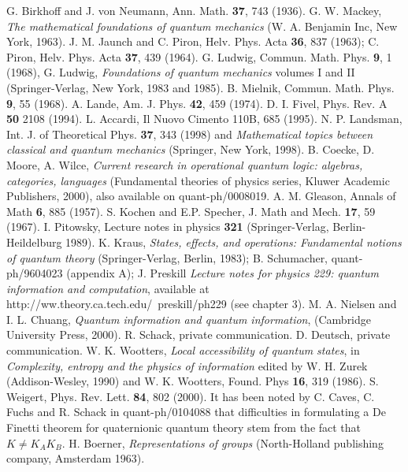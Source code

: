 \documentclass[12pt]{article}
\begin{document}
\begin{thebibliography}{00}
 G. Birkhoff and J. von Neumann, Ann. Math. {\bf 37},
743 (1936).
 G. W. Mackey, {\it The mathematical foundations of
quantum mechanics} (W. A. Benjamin Inc, New York, 1963).
 J. M. Jaunch and C. Piron, Helv. Phys. Acta {\bf 36},
837 (1963); C. Piron, Helv. Phys. Acta {\bf 37}, 439 (1964).
 G. Ludwig, Commun. Math. Phys. {\bf 9}, 1 (1968), G.
Ludwig, {\it Foundations of quantum mechanics} volumes I and II
(Springer-Verlag, New York, 1983 and 1985).
 B. Mielnik, Commun. Math. Phys. {\bf 9}, 55 (1968).
 A. Lande, Am. J. Phys. {\bf 42}, 459 (1974).
 D. I. Fivel, Phys. Rev. A {\bf 50} 2108 (1994).
 L. Accardi, Il Nuovo Cimento 110B, 685 (1995).
 N. P. Landsman, Int. J. of Theoretical Phys. {\bf
37}, 343 (1998) and {\it Mathematical topics between classical and
quantum mechanics} (Springer, New York, 1998).
 B. Coecke, D. Moore, A. Wilce, {\it Current research in
operational quantum logic: algebras, categories, languages} (Fundamental
theories of physics series, Kluwer Academic Publishers, 2000), also
available on quant-ph/0008019.
 A. M. Gleason, Annals of Math {\bf 6}, 885 (1957).
 S. Kochen and E.P. Specher, J. Math and Mech. {\bf 17},
59 (1967).
 I. Pitowsky, Lecture notes in physics {\bf 321}
(Springer-Verlag, Berlin-Heildelburg 1989).
 K. Kraus, {\it States, effects, and operations:
Fundamental notions of quantum theory} (Springer-Verlag, Berlin, 1983);
B. Schumacher, quant-ph/9604023 (appendix A); J. Preskill {\it Lecture
notes for physics 229: quantum information and computation}, available
at http://ww.theory.ca.tech.edu/~preskill/ph229 (see chapter 3).
 M. A. Nielsen and I. L. Chuang, {\it Quantum
information and quantum information}, (Cambridge University Press,
2000).
 R. Schack, private communication.
 D. Deutsch, private communication.
 W. K. Wootters, {\it Local accessibility of quantum
states}, in {\it Complexity, entropy and the physics of information}
edited by W. H. Zurek (Addison-Wesley, 1990) and W. K. Wootters, Found.
Phys {\bf 16}, 319 (1986).
 S. Weigert, Phys. Rev. Lett. {\bf 84}, 802 (2000).
 It has been noted by C. Caves, C. Fuchs and R. Schack in
quant-ph/0104088 that difficulties in formulating a De Finetti theorem for
quaternionic quantum theory stem from the fact that $K\not=K_AK_B$.
 H. Boerner, {\it Representations of groups}
(North-Holland publishing company, Amsterdam 1963).
\end{thebibliography}
\end{document}
